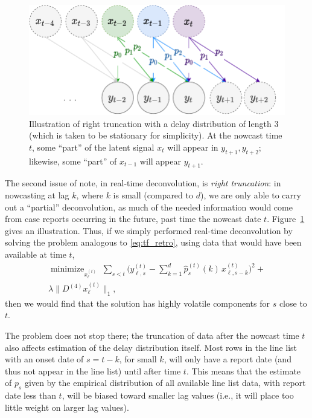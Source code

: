 \documentclass[sts]{imsart}
\newcommand{\minimize}{\mathop{\mathrm{minimize}}}
\def\hx{\hat{x}}
\def\hp{\hat{p}}
\theoremstyle{plain}
\theoremstyle{definition}
\theoremstyle{remark}
\begin{document}
\begin{figure}[tb]
\centering	
\includegraphics[width=0.95\linewidth]{./figures/right_truncation_illustration.pdf}
\caption{Illustration of right truncation with a delay distribution of length 3
  (which is taken to be stationary for simplicity). At the nowcast time $t$,
  some ``part'' of the latent signal $x_t$ will appear in $y_{t+1},y_{t+2}$;
  likewise, some ``part'' of $x_{t-1}$ will appear $y_{t+1}$.}   
\label{fig:right_truncation}
\end{figure}

The second issue of note, in real-time deconvolution, is \emph{right
  truncation}: in nowcasting at lag $k$, where $k$ is small (compared to $d$),
we are only able to carry out a ``partial'' deconvolution, as much of the needed  
information would come from case reports occurring in the future, past time the
nowcast date $t$. Figure~\ref{fig:right_truncation} gives an illustration. Thus,
if we simply performed real-time deconvolution by solving the problem analogous
to \eqref{eq:tf_retro}, using data that would have been available at time $t$,   
\begin{multline}
\label{eq:tf_realtime1}
\minimize_{x^{(t)}_\ell} \; \sum_{s < t} \bigg( y^{(t)}_{\ell,s} -
\sum_{k=1}^d \hp^{(t)}_s(k) \, x^{(t)}_{\ell, s-k} \bigg)^2 +{} \\  
\lambda \big\|D^{(4)} x^{(t)}_\ell\big\|_1,
\end{multline}
then we would find that the solution \smash{$\hx^{(t)}_\ell = (\hx^{(t)}_{\ell,s}
  : s < t)$} has highly volatile components for $s$ close to $t$.

The problem does not stop there; the truncation of data after the nowcast time
$t$ also affects estimation of the delay distribution itself. Most rows in the
line list with an onset date of $s=t-k$, for small $k$, will only have a report
date (and thus not appear in the line list) until after time $t$. This means
that the estimate \smash{$\hp^{(t)}_s$} of $p_s$ given by the empirical
distribution of all available line list data, with report date less than $t$,
will be biased toward smaller lag values (i.e., it will place too little weight
on larger lag values).    
\end{document}
